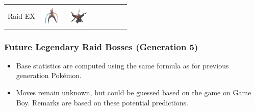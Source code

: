 \documentclass[8pt,aspectratio=169,compress]{beamer}
\begin{document}
\begin{frame}
\begin{block}{}
\begin{tiny}
\begin{tabular}{lccccccc}
Raid EX
& \includegraphics[width=1cm]{../../images/pokemon/deoxys_s.png}
& \includegraphics[width=1cm]{../../images/pokemon/darkrai.png} \\
\end{tabular}
\end{tiny}
\end{block}
\end{frame}


\begin{frame}
\frametitle{Future Legendary Raid Bosses (Generation 5)}

\begin{block}{}
\begin{tiny}
\begin{itemize}
\item Base statistics are computed using the same formula as for previous generation Pok\'emon.
\item Moves remain unknown, but could be guessed based on the game on Game Boy. Remarks are based on these potential predictions.
\end{itemize}


\end{tiny}
\end{block}
\end{frame}
\end{document}
